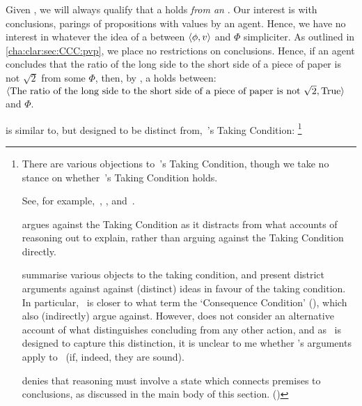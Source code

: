 \begin{note}
  Given \supportI{}, we will always qualify that a \ros{} holds \emph{from an \agpe{}}.
  Our interest is with conclusions, parings of propositions with values by an agent.
  Hence, we have no interest in whatever the idea of a \ros{} between \(\langle \phi, v \rangle\) and \(\Phi\) simpliciter.
  As outlined in \autoref{cha:clar:sec:CCC:pvp}, we place no restrictions on conclusions.
  Hence, if an agent concludes that the ratio of the long side to the short side of a piece of paper is not \(\sqrt{2}\) from some \pool{} \(\Phi\), then, by \supportI{}, a \ros{} holds between:
  \(\langle \text{The ratio of the long side to the short side of a piece of paper is not }\sqrt{2}, \text{True} \rangle\) and \(\Phi\).
\end{note}

\begin{note}
 \supportI{} is similar to, but designed to be distinct from,~\citeauthor{Boghossian:2014aa}'s Taking Condition:%
  \footnote{
    There are various objections to~\citeauthor{Boghossian:2014aa}'s Taking Condition, though we take no stance on whether~\citeauthor{Boghossian:2014aa}'s Taking Condition holds.

    See, for example,~\textcite{Hlobil:2014tq}, \textcite{McHugh:2016vp}, and~\textcite{Wright:2014tt}.

    \citeauthor{Hlobil:2014tq} argues against the Taking Condition as it distracts from what accounts of reasoning out to explain, rather than arguing against the Taking Condition directly.

    \citeauthor{McHugh:2016vp} summarise various objects to the taking condition, and present district arguments against against (distinct) ideas in favour of the taking condition.
    In particular,~\supportI{} is closer to what \citeauthor{McHugh:2016vp} term the `Consequence Condition' (\citeyear[cf.][316]{McHugh:2016vp}), which \citeauthor{McHugh:2016vp} also (indirectly) argue against.
    However, \citeauthor{McHugh:2016vp} does not consider an alternative account of what distinguishes concluding from any other action, and as~\supportI{} is designed to capture this distinction, it is unclear to me whether \citeauthor{McHugh:2016vp}'s arguments apply to~\supportI{} (if, indeed, they are sound).

    \citeauthor{Wright:2014tt} denies that reasoning must involve a state which connects premises to conclusions, as discussed in the main body of this section. (\citeyear[Cf.][33-34]{Wright:2014tt})
  }


\end{note}
